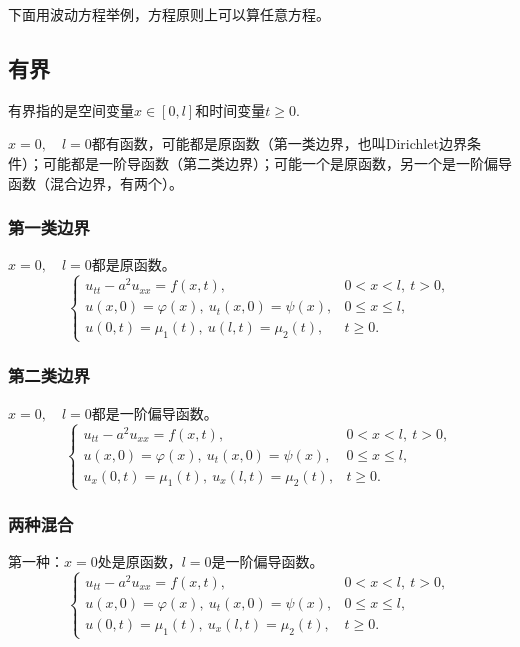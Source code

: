 \documentclass[12pt,a4paper]{article}
\numberwithin{subsection}{section}   %
\numberwithin{subsubsection}{subsection}
\theoremstyle{plain}
\theoremstyle{definition}
\theoremstyle{remark}
\theoremstyle{remark}
\begin{document}
	  下面用波动方程举例，方程原则上可以算任意方程。
	\subsection{有界}
	有界指的是空间变量$x \in [0,l]$和时间变量$t \geq 0$.
	
	$x=0,\quad l=0$都有函数，可能都是原函数（第一类边界，也叫Dirichlet边界条件）；可能都是一阶导函数（第二类边界）；可能一个是原函数，另一个是一阶偏导函数（混合边界，有两个）。
	\subsubsection{第一类边界}
	$x=0,\quad l=0$都是原函数。
	\begin{equation}\label{The bounded wave equation with Dirichlet boundary conditions}
		\begin{cases}
			u_{tt} - a^2 u_{xx} = f(x, t), & 0 < x < l, \ t > 0, \\
			u(x, 0) = \varphi(x), \ u_t(x, 0) = \psi(x), & 0 \leq x \leq l, \\
			u(0, t) = \mu_1(t), \ u(l, t) = \mu_2(t), & t \geq 0.
		\end{cases}
	\end{equation}
		\subsubsection{第二类边界}
			$x=0,\quad l=0$都是一阶偏导函数。
		\begin{equation}\label{The bounded wave equation with Neumann boundary conditions}
			\begin{cases}
				u_{tt} - a^2 u_{xx} = f(x, t), & 0 < x < l, \ t > 0, \\
				u(x, 0) = \varphi(x), \ u_t(x, 0) = \psi(x), & 0 \leq x \leq l, \\
            	u_x(0, t) = \mu_1(t), \ u_x(l, t) = \mu_2(t), & t \geq 0.
			\end{cases}
		\end{equation}
		
		
		\subsubsection{两种混合}
	第一种：$x=0$处是原函数，$ l=0$是一阶偏导函数。
		\begin{equation}\label{The bounded wave equation with mixed boundary conditions_1}
			\begin{cases}
				u_{tt} - a^2 u_{xx} = f(x, t), & 0 < x < l, \ t > 0, \\
				u(x, 0) = \varphi(x), \ u_t(x, 0) = \psi(x), & 0 \leq x \leq l, \\
				u(0, t) = \mu_1(t), \ u_x(l, t) = \mu_2(t), & t \geq 0.
			\end{cases}
			\end{equation}
		
\end{document}
